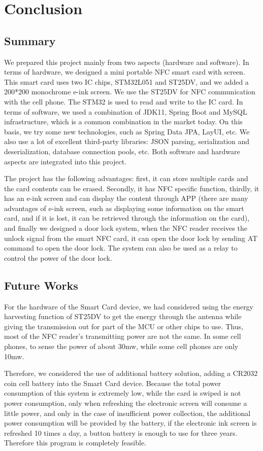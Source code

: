 \documentclass[11pt, a4paper]{article}
\begin{document}
\section{Conclusion}
\subsection{Summary}

We prepared this project mainly from two aspects (hardware and software). In terms of hardware, we designed a mini portable NFC smart card with screen. This smart card uses two IC chips, STM32L051 and ST25DV, and we added a 200*200 monochrome e-ink screen. We use the ST25DV for NFC communication with the cell phone. The STM32 is used to read and write to the IC card. In terms of software, we used a combination of JDK11, Spring Boot and MySQL infrastructure, which is a common combination in the market today. On this basis, we try some new technologies, such as Spring Data JPA, LayUI, etc. We also use a lot of excellent third-party libraries: JSON parsing, serialization and deserialization, database connection pools, etc. Both software and hardware aspects are integrated into this project.

The project has the following advantages: first, it can store multiple cards and the card contents can be erased. Secondly, it has NFC specific function, thirdly, it has an e-ink screen and can display the content through APP (there are many advantages of e-ink screen, such as displaying some information on the smart card, and if it is lost, it can be retrieved through the information on the card), and finally we designed a door lock system, when the NFC reader receives the unlock signal from the smart NFC card, it can open the door lock by sending AT command to open the door lock. The system can also be used as a relay to control the power of the door lock.

\subsection{Future Works}

For the hardware of the Smart Card device, we had considered using the energy harvesting function of ST25DV to get the energy through the antenna while giving the transmission out for part of the MCU or other chips to use. Thus, most of the NFC reader's transmitting power are not the same. In some cell phones, to sense the power of about 30mw, while some cell phones are only 10mw.

Therefore, we considered the use of additional battery solution, adding a CR2032 coin cell battery into the Smart Card device. Because the total power consumption of this system is extremely low, while the card is swiped is not power consumption, only when refreshing the electronic screen will consume a little power, and only in the case of insufficient power collection, the additional power consumption will be provided by the battery, if the electronic ink screen is refreshed 10 times a day, a button battery is enough to use for three years. Therefore this program is completely feasible.


\nocite{*}
\printbibliography
\end{document}
